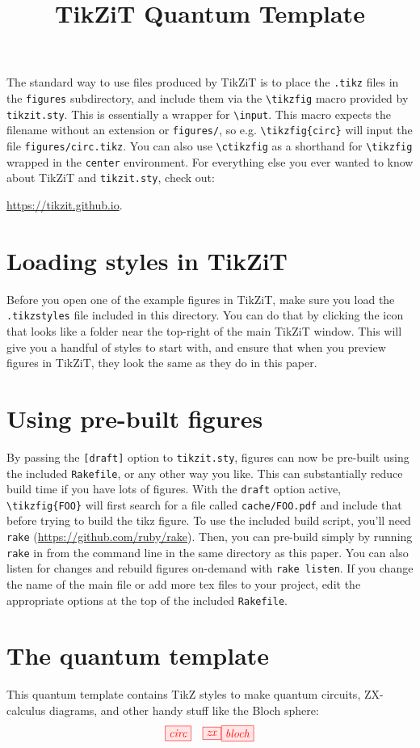 \documentclass{article}
\title{TikZiT Quantum Template}
\author{}
\begin{document}
\maketitle

The standard way to use files produced by TikZiT is to place the \texttt{.tikz} files in the \texttt{figures} subdirectory, and include them via the \texttt{\textbackslash{}tikzfig} macro provided by \texttt{tikzit.sty}. This is essentially a wrapper for \texttt{\textbackslash{}input}. This macro expects the filename without an extension or \texttt{figures/}, so e.g. \texttt{\textbackslash{}tikzfig\{circ\}} will input the file \texttt{figures/circ.tikz}. You can also use \texttt{\textbackslash{}ctikzfig} as a shorthand for \texttt{\textbackslash{}tikzfig} wrapped in the \texttt{center} environment. For everything else you ever wanted to know about TikZiT and \texttt{tikzit.sty}, check out:

\begin{center}
  \url{https://tikzit.github.io}.
\end{center}

\section*{Loading styles in TikZiT}

Before you open one of the example figures in TikZiT, make sure you load the \texttt{.tikzstyles} file included in this directory. You can do that by clicking the icon that looks like a folder near the top-right of the main TikZiT window. This will give you a handful of styles to start with, and ensure that when you preview figures in TikZiT, they look the same as they do in this paper.

\section*{Using pre-built figures}

By passing the \texttt{[draft]} option to \texttt{tikzit.sty}, figures can now be pre-built using the included \texttt{Rakefile}, or any other way you like. This can substantially reduce build time if you have lots of figures. With the \texttt{draft} option active, \texttt{\textbackslash{}tikzfig\{FOO\}} will first search for a file called \texttt{cache/FOO.pdf} and include that before trying to build the tikz figure. To use the included build script, you'll need \texttt{rake} (\url{https://github.com/ruby/rake}). Then, you can pre-build simply by running \texttt{rake} in from the command line in the same directory as this paper. You can also listen for changes and rebuild figures on-demand with \texttt{rake listen}. If you change the name of the main file or add more tex files to your project, edit the appropriate options at the top of the included \texttt{Rakefile}.

\section*{The quantum template}

This quantum template contains TikZ styles to make quantum circuits, ZX-calculus diagrams, and other handy stuff like the Bloch sphere:
\[
\tikzfig{circ} \quad
\tikzfig{zx}
\tikzfig{bloch}
\]
\end{document}
